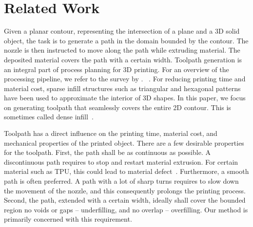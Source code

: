 \section{Related Work}

Given a planar contour, representing the intersection of a plane and a 3D solid object, the task is to generate a path in the domain bounded by the contour.
The nozzle is then instructed to move along the path while extruding material.
The deposited material covers the path with a certain width.
Toolpath generation is an integral part of process planning for 3D printing.
For an overview of the processing pipeline, we refer to the survey by \citeauthor{Livesu2017CGF}.~\cite{Livesu2017CGF} .
For reducing printing time and material cost, sparse infill structures such as triangular and hexagonal patterns have been used to approximate the interior of 3D shapes.
In this paper, we focus on generating toolpath that seamlessly covers the entire 2D contour.
This is sometimes called dense infill~\cite{Livesu2017CGF}.

Toolpath has a direct influence on the printing time, material cost, and mechanical properties of the printed object.
There are a few desirable properties for the toolpath.
First, the path shall be as continuous as possible.
A discontinuous path requires to stop and restart material extrusion. 
For certain material such as TPU, this could lead to material defect~\cite{KUIPERS2019CAD}.
Furthermore, a smooth path is often preferred.
A path with a lot of sharp turns requires to slow down the movement of the nozzle, and this consequently prolongs the printing process.
Second, the path, extended with a certain width, ideally shall cover the bounded region no voids or gaps --  underfilling, and no overlap -- overfilling.
Our method is primarily concerned with this requirement. 


